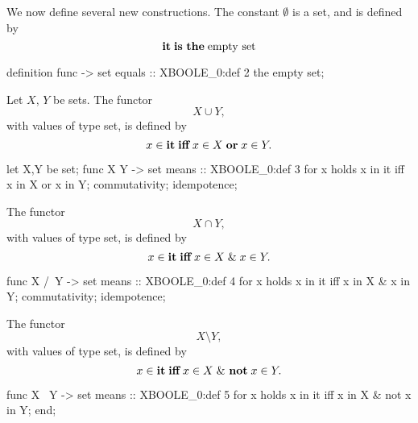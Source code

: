 \begin{paracol}{2}
\switchcolumn*\ensurevspace{5cm}

We now define several new constructions. The constant $\emptyset$ is a set, and is
defined by
\[\mathop{\textbf{it}} \mathrel{\textbf{is}}\ \mathrel{\textbf{the}} \mathrm{empty}\ \mathrm{set} \]

\switchcolumn

\begin{mizar}
definition
  func {} -> set
  equals :: XBOOLE_0:def 2
  the empty set;
\end{mizar}

\switchcolumn*\ensurevspace{5cm}\noindent%
Let $X$, $Y$ be sets. The functor
\[ X\cup Y,\]
with values of type set, is defined by
\[ x\in\mathop{\textbf{it}} \mathrel{\textbf{iff}} x\in X\mathrel{\textbf{or}} x\in Y. \]

\switchcolumn

\begin{mizar}
  let X,Y be set;
  func X \/ Y -> set
  means :: XBOOLE_0:def 3
  for x holds x in it
  iff x in X or x in Y;
  commutativity;
  idempotence;
\end{mizar}

\switchcolumn*\ensurevspace{5cm}\sloppy\noindent%
The functor
\[ X\cap Y,\]
with values of type set, is defined by
\[ x\in\mathop{\textbf{it}} \mathrel{\textbf{iff}} x\in X\mathrel{\&} x\in Y. \]

\switchcolumn

\begin{mizar}
  func X /\ Y -> set
  means :: XBOOLE_0:def 4
  for x holds x in it
  iff x in X & x in Y;
  commutativity;
  idempotence;
\end{mizar}

\switchcolumn*\ensurevspace{5cm}\noindent%
The functor
\[ X\setminus Y,\]
with values of type set, is defined by
\[ x\in\mathop{\textbf{it}} \mathrel{\textbf{iff}} x\in X\mathrel{\&}\ \mathrel{\textbf{not}} x\in Y. \]

\switchcolumn

\begin{mizar}
  func X \ Y -> set
  means :: XBOOLE_0:def 5
  for x holds x in it
  iff x in X & not x in Y;
end;
\end{mizar}

\switchcolumn*
\switchcolumn
\begin{mizar}
\end{mizar}
\end{paracol}
